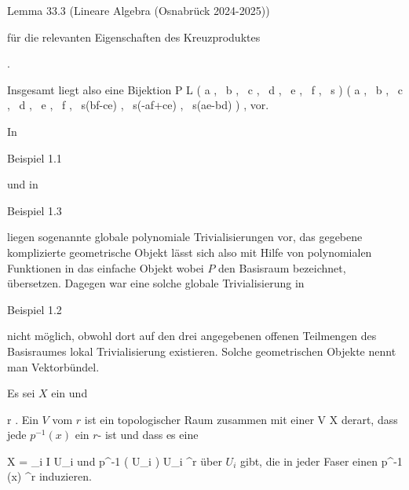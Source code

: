 {{Lemma 33.3 (Lineare Algebra (Osnabrück 2024-2025))

für die relevanten Eigenschaften des Kreuzproduktes} {} {.}

Insgesamt liegt also eine Bijektion
\maabbeledisp {} {P \times \R} { L
} { \left(  a   , \,   b  , \,   c , \,   d   , \,   e  , \,   f   , \,   s        \right) } { \left(  a   , \,   b  , \,   c , \,   d   , \,   e  , \,   f   , \,   s(bf-ce)    , \,  s(-af+ce) , \,  s(ae-bd)   \right)
} {,}
vor.





}

In

Beispiel 1.1

und in

Beispiel 1.3

liegen sogenannte globale polynomiale Trivialisierungen vor, das gegebene komplizierte geometrische Objekt lässt sich also mit Hilfe von polynomialen Funktionen in das einfache Objekt
 wobei $P$ den Basisraum bezeichnet, übersetzen. Dagegen war eine solche globale Trivialisierung in

Beispiel 1.2

nicht möglich, obwohl dort auf den drei angegebenen offenen Teilmengen des Basisraumes lokal Trivialisierung existieren. Solche geometrischen Objekte nennt man Vektorbündel.







{}
{





Es sei $X$ ein
und

\mavergleichskette
{\vergleichskette
{r
}
{ \in }{\N
}
{  }{
}
{    }{
}
{   }{
}
}
{}{}{.}
Ein
$V$ vom
$r$ ist ein topologischer Raum zusammen mit einer
 { V } { X
} {}
derart, dass jede
$p^{-1}(x)$ ein
$r$-
ist und dass es eine

\mavergleichskette
{\vergleichskette
{X
}
{ = }{ \bigcup_{i \in I} U_i
}
{  }{
}
{    }{
}
{   }{
}
}
{}{}{}
und
 {p^{-1} \left(  U_i  \right) } { U_i \times \R^r
} {}
über $U_i$ gibt, die in jeder Faser einen
 {p^{-1} (x) } { \R^r
} {}
induzieren.





}

